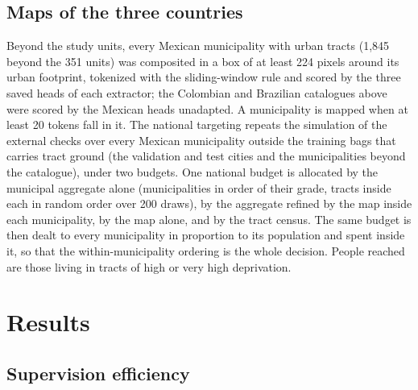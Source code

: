\documentclass[11pt]{article}
\begin{document}
\subsection{Maps of the three countries}

Beyond the study units, every Mexican municipality with urban tracts (1{,}845 beyond
the 351 units) was composited in a box of at least 224 pixels around its urban
footprint, tokenized with the sliding-window rule and scored by the three saved heads
of each extractor; the Colombian and Brazilian catalogues above were scored by the
Mexican heads unadapted. A municipality is mapped when at least 20 tokens fall in it.
The national targeting repeats the simulation of the external checks over every Mexican
municipality outside the training bags that carries tract ground (the validation and
test cities and the municipalities beyond the catalogue), under two budgets. One
national budget is allocated by the municipal aggregate alone (municipalities in order
of their grade, tracts inside each in random order over 200 draws), by the aggregate
refined by the map inside each municipality, by the map alone, and by the tract census.
The same budget is then dealt to every municipality in proportion to its population and
spent inside it, so that the within-municipality ordering is the whole decision. People
reached are those living in tracts of high or very high deprivation.

\section{Results}

\subsection{Supervision efficiency}
\end{document}
